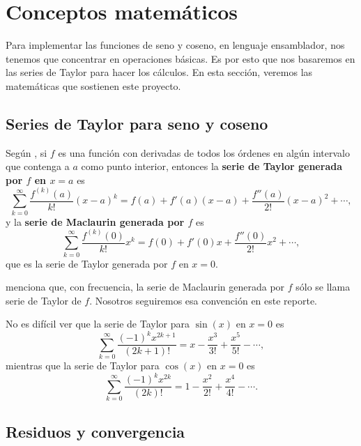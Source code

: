 \documentclass[12pt]{article}
\begin{document}
\section{Conceptos matemáticos}

Para implementar las funciones de seno y coseno, en lenguaje ensamblador, nos
tenemos que concentrar en operaciones básicas. Es por esto que nos basaremos en
las series de Taylor para hacer los cálculos. En esta sección, veremos las
matemáticas que sostienen este proyecto.

\subsection{Series de Taylor para seno y coseno}

Según \textcite{ThomasBook}, si $f$ es una función con derivadas de todos los
órdenes en algún intervalo que contenga a $a$ como punto interior, entonces la
\textbf{serie de Taylor generada por $f$ en $x=a$} es
\begin{equation}
  \sum_{k=0}^{\infty} \frac{f^{(k)}(a)}{k!} (x-a)^k = f(a) + f'(a)(x-a) +
    \frac{f''(a)}{2!}(x-a)^2 + \cdots,
\end{equation}
y la \textbf{serie de Maclaurin generada por $f$} es
\begin{equation}
  \sum_{k=0}^{\infty} \frac{f^{(k)}(0)}{k!} x^k = f(0) + f'(0)x +
    \frac{f''(0)}{2!}x^2 + \cdots,
\end{equation}
que es la serie de Taylor generada por $f$ en $x=0$.

\textcite{ThomasBook} menciona que, con frecuencia, la serie de Maclaurin
generada por $f$ sólo se llama serie de Taylor de $f$. Nosotros seguiremos esa
convención en este reporte.

No es difícil ver que la serie de Taylor para $\sin(x)$ en $x=0$ es
\begin{equation}
  \sum_{k=0}^{\infty} \frac{(-1)^k x^{2k+1}}{(2k+1)!}
    = x - \frac{x^3}{3!} + \frac{x^5}{5!} - \cdots,
\end{equation}
mientras que la serie de Taylor para $\cos(x)$ en $x=0$ es
\begin{equation}
  \sum_{k=0}^{\infty} \frac{(-1)^k x^{2k}}{(2k)!}
    = 1 - \frac{x^2}{2!} + \frac{x^4}{4!} - \cdots.
\end{equation}

\subsection{Residuos y convergencia}
\end{document}
